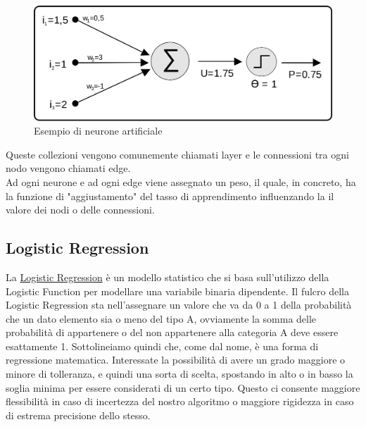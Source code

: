 \begin{figure}[H]
\centering
\includegraphics[scale=0.1]{img/neuroneArtificiale.png}
\caption{Esempio di neurone artificiale}
\end{figure}

Queste collezioni vengono comunemente chiamati layer e le connessioni tra ogni nodo vengono chiamati edge.\\
Ad ogni neurone e ad ogni edge viene assegnato un peso, il quale, in concreto, ha la funzione di "aggiustamento" del tasso di apprendimento influenzando la il valore dei nodi o delle connessioni.

\subsection{Logistic Regression}
La \href{https://en.wikipedia.org/wiki/Logistic_regression}{Logistic Regression}  è un modello statistico che si basa sull'utilizzo della Logistic Function per modellare una variabile binaria dipendente. Il fulcro della Logistic Regression sta nell'assegnare un valore che va da 0 a 1 della probabilità che un dato elemento sia o meno del tipo A, ovviamente la somma delle probabilità di appartenere o del non appartenere alla categoria A deve essere esattamente 1. Sottolineiamo quindi che, come dal nome, è una forma di regressione matematica. Interessate la possibilità di avere un grado maggiore o minore di tolleranza, e quindi una sorta di scelta, spostando in alto o in basso la soglia minima per essere considerati di un certo tipo. Questo ci consente maggiore flessibilità in caso di incertezza del nostro algoritmo o maggiore rigidezza in caso di estrema precisione dello stesso.